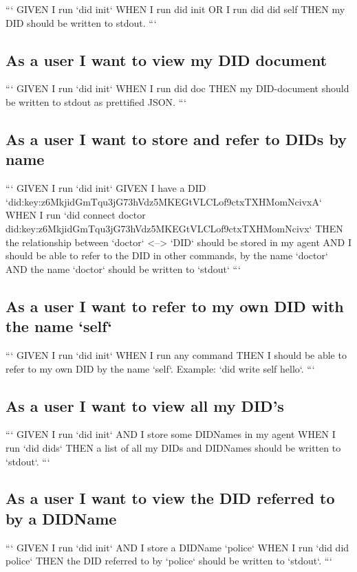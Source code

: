 ```
GIVEN I run `did init`
WHEN  I run did init
OR    I run did did self
THEN  my DID should be written to stdout.
```

\subsection{As a user I want to view my DID document}

```
GIVEN I run `did init`
WHEN  I run did doc
THEN  my DID-document should be written to stdout as prettified JSON.
```

\subsection{As a user I want to store and refer to DIDs by name}

```
GIVEN I run `did init`
GIVEN I have a DID `did:key:z6MkjidGmTqu3jG73hVdz5MKEGtVLCLof9ctxTXHMomNcivxA`
WHEN  I run `did connect doctor did:key:z6MkjidGmTqu3jG73hVdz5MKEGtVLCLof9ctxTXHMomNcivx`
THEN  the relationship between `doctor` <--> `DID` should be stored in my agent
AND   I should be able to refer to the DID in other commands, by the name `doctor`
AND   the name `doctor` should be written to `stdout`
```

\subsection{As a user I want to refer to my own DID with the name `self`}

```
GIVEN I run `did init`
WHEN  I run any command
THEN  I should be able to refer to my own DID by the name `self`. Example: `did write self hello`.
```

\subsection{As a user I want to view all my DID's}

```
GIVEN I run `did init`
AND   I store some DIDNames in my agent
WHEN  I run `did dids`
THEN  a list of all my DIDs and DIDNames should be written to `stdout`.
```

\subsection{As a user I want to view the DID referred to by a DIDName}

```
GIVEN I run `did init`
AND   I store a DIDName `police`
WHEN  I run `did did police`
THEN  the DID referred to by `police` should be written to `stdout`.
```

